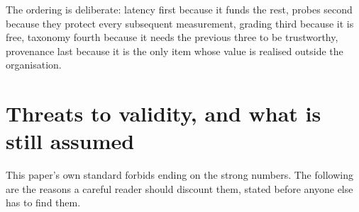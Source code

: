 \documentclass[11pt,a4paper]{article}
\begin{document}
The ordering is deliberate: latency first because it funds the rest, probes second because they protect every subsequent measurement, grading third because it is free, taxonomy fourth because it needs the previous three to be trustworthy, provenance last because it is the only item whose value is realised outside the organisation.


\section{Threats to validity, and what is still assumed}\label{sec:validity}


This paper's own standard forbids ending on the strong numbers. The following are the reasons a careful reader should discount them, stated before anyone else has to find them.
\end{document}
